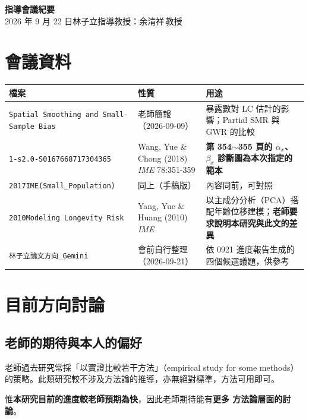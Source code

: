 \documentclass[UTF8, fontset=macnew, a4paper, 12pt]{ctexart}
\begin{document}
\begin{center}
{\bfseries 指導會議紀要}\\[4pt]
{ 2026 年 9 月 22 日\quad 林子立\quad 指導教授：余清祥\,教授}
\end{center}

\vspace{6pt}

\section{會議資料}

\begin{table}[H]
\centering\small
\begin{tabular}{llp{6.6cm}}
\toprule
檔案 & 性質 & 用途\\
\midrule
\texttt{Spatial Smoothing and Small-Sample Bias} &
  老師簡報（2026-09-09） & 暴露數對 LC 估計的影響；Partial SMR 與 GWR 的比較\\
\texttt{1-s2.0-S0167668717304365} &
  Wang, Yue \& Chong (2018) \textit{IME} 78:351-359 &
  \textbf{第 354$\sim$355 頁的 $\alpha_x$、$\beta_x$ 診斷圖為本次指定的範本}\\
\texttt{2017IME(Small\_Population)} & 同上（手稿版） & 內容同前，可對照\\
\texttt{2010Modeling Longevity Risk} &
  Yang, Yue \& Huang (2010) \textit{IME} &
  以主成分分析（PCA）搭配年齡位移建模；\textbf{老師要求說明本研究與此文的差異}\\
\texttt{林子立論文方向\_Gemini} & 會前自行整理（2026-09-21） &
  依 0921 進度報告生成的四個候選議題，供參考\\
\bottomrule
\end{tabular}
\end{table}

\section{目前方向討論}

\subsection{老師的期待與本人的偏好}

老師過去研究常採「以實證比較若干方法」（empirical study for some methods）
的策略。此類研究較不涉及方法論的推導，亦無絕對標準，方法可用即可。

惟\textbf{本研究目前的進度較老師預期為快}，因此老師期待能有\textbf{更多
方法論層面的討論}。
\end{document}
